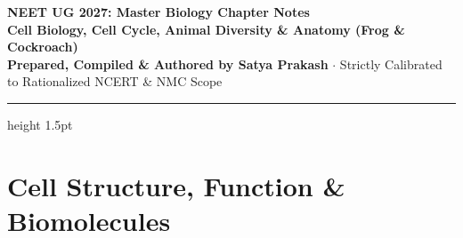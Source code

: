 \documentclass[10pt,a4paper]{article}
\begin{document}
\begin{center}
  {\Huge \textbf{NEET UG 2027: Master Biology Chapter Notes}}\\[6pt]
  {\Large \textbf{Cell Biology, Cell Cycle, Animal Diversity \& Anatomy (Frog \& Cockroach)}}\\[4pt]
  {\small \textbf{Prepared, Compiled \& Authored by Satya Prakash} $\cdot$ Strictly Calibrated to Rationalized NCERT \& NMC Scope}
  \vspace{4pt}
  \hrule height 1.5pt
\end{center}

\pagestyle{fancy}
\fancyhf{}
\fancyfoot[C]{\thepage}

\section{Cell Structure, Function \& Biomolecules}
\end{document}
